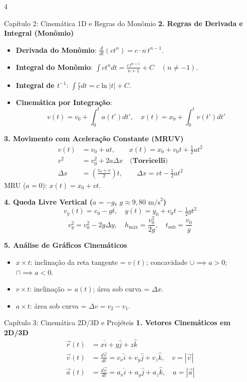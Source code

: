 \documentclass[9pt,a4paper,landscape]{extarticle}
\begin{document}
\begin{multicols*}{4}
\begin{topicbox}{Capítulo 2: Cinemática 1D e Regras do Monômio}
\textbf{2. Regras de Derivada e Integral (Monômio)}
\begin{itemize}
    \item \textbf{Derivada do Monômio}: $\frac{d}{dt}(c t^n) = c \cdot n \, t^{n-1}$.
    \item \textbf{Integral do Monômio}: $\int c t^n dt = \frac{c \, t^{n+1}}{n+1} + C \quad (n \neq -1)$.
    \item \textbf{Integral de $t^{-1}$}: $\int \frac{c}{t} dt = c \ln|t| + C$.
    \item \textbf{Cinemática por Integração}:
    \begin{equation*}
        v(t) = v_0 + \int_0^t a(t') dt', \quad x(t) = x_0 + \int_0^t v(t') dt'
    \end{equation*}
\end{itemize}

\textbf{3. Movimento com Aceleração Constante (MRUV)}
\begin{align*}
    v(t) &= v_0 + at, \qquad x(t) = x_0 + v_0 t + \tfrac{1}{2} a t^2 \\
    v^2 &= v_0^2 + 2a\Delta x \quad \textbf{(Torricelli)} \\
    \Delta x &= \left(\frac{v_0 + v}{2}\right) t, \qquad \Delta x = v t - \tfrac{1}{2} a t^2
\end{align*}
MRU ($a=0$): $x(t) = x_0 + v t$.

\textbf{4. Queda Livre Vertical ($a = -g$, $g \approx 9{,}80\text{ m/s}^2$)}
\begin{equation*}
    v_y(t) = v_0 - gt, \quad y(t) = y_0 + v_0 t - \tfrac{1}{2} gt^2
\end{equation*}
\begin{equation*}
    v_y^2 = v_0^2 - 2g\Delta y, \quad h_{\text{máx}} = \frac{v_0^2}{2g}, \quad t_{\text{sub}} = \frac{v_0}{g}
\end{equation*}

\textbf{5. Análise de Gráficos Cinemáticos}
\begin{itemize}
    \item $x \times t$: inclinação da reta tangente = $v(t)$; concavidade $\cup \implies a > 0$; $\cap \implies a < 0$.
    \item $v \times t$: inclinação = $a(t)$; área sob curva = $\Delta x$.
    \item $a \times t$: área sob curva = $\Delta v = v_2 - v_1$.
\end{itemize}
\end{topicbox}

\begin{topicbox}{Capítulo 3: Cinemática 2D/3D e Projéteis}
\textbf{1. Vetores Cinemáticos em 2D/3D}
\begin{align*}
    \vec{r}(t) &= x\hat{i} + y\hat{j} + z\hat{k} \\
    \vec{v}(t) &= \frac{d\vec{r}}{dt} = v_x\hat{i} + v_y\hat{j} + v_z\hat{k}, \quad v = |\vec{v}| \\
    \vec{a}(t) &= \frac{d\vec{v}}{dt} = a_x\hat{i} + a_y\hat{j} + a_z\hat{k}, \quad a = |\vec{a}|
\end{align*}


\end{topicbox}
\end{multicols*}
\end{document}
